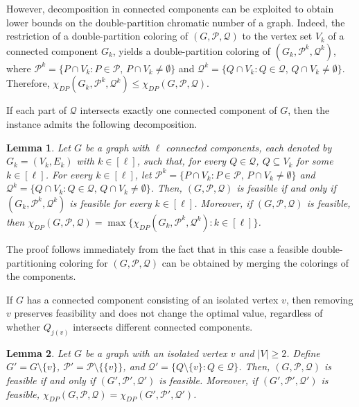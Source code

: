 \documentclass[preprint, 11pt, authoryear]{elsarticle}
\newtheorem{lemma}{Lemma}[section]
\newcommand{\PP}{{\mathcal P}}
\newcommand{\QQ}{{\mathcal Q}}
\newcommand{\dpcn}[1]{\chi_{DP}(#1)}
\begin{document}
However, decomposition in connected components can be exploited to obtain lower bounds on the double-partition chromatic number of a graph. Indeed, the restriction of a double-partition coloring of $(G,\PP,\QQ)$ to the vertex set $V_k$ of a connected component $G_k$, yields a double-partition coloring of  $(G_k,\PP^k,\QQ^k)$, 
where  $\PP^k=\{P\cap V_k : P\in \PP, \,  P\cap V_k \neq \emptyset\}$ and $\QQ^k=\{Q\cap V_k : Q\in \QQ,\,  Q\cap V_k \neq \emptyset\}$.
Therefore,
$\dpcn{G_k,\PP^k,\QQ^k} \leq \dpcn{G,\PP,\QQ}$.


If each part of $\QQ$ intersects exactly one connected component of $G$, then the instance admits the following decomposition.

\begin{lemma}
\label{connectedcomponentsandisolatedvertices}
Let $G$ be a graph with $\ell$ connected components, each denoted by $G_k=(V_k, E_k)$ with $k\in [\ell]$, such that, for every $Q \in \QQ$, $Q \subseteq V_k$ for some $k \in [\ell]$.
For every $k \in [\ell]$, let $\PP^k = \{P \cap V_k: P \in \PP, \,P\cap V_k \neq \emptyset\}$ and $\QQ^k = \{Q \cap V_k: Q \in \QQ, \, Q\cap V_k \neq \emptyset\}$.
Then, $(G,\mathcal{P},\mathcal{Q})$ is feasible if and only if $(G_k, \mathcal{P}^k, \mathcal{Q}^k)$ is feasible for every $k\in [\ell]$. Moreover, if $(G,\mathcal{P},\mathcal{Q})$ is feasible, then
$\dpcn{G, \mathcal{P}, \mathcal{Q}}=\max \{\dpcn{G_k, \mathcal{P}^k, \mathcal{Q}^k}:k\in [\ell]\}$.
\end{lemma}

The proof follows immediately from the fact that in this case a feasible double-partitioning coloring for $(G, \PP, \QQ)$ can be obtained by merging the colorings of the components.

If $G$ has a connected component consisting of an isolated vertex $v$, then removing $v$ preserves feasibility and does not change the optimal value, regardless of whether $Q_{j(v)}$ intersects different connected components.

\begin{lemma}\label{Isolated}
Let $G$ be a graph with an isolated vertex $v$ and $|V| \geq 2$.
Define $G' = G \setminus \{v\}$, $\PP' = \PP \setminus \{\{v\}\}$, and $\QQ' = \{ Q \setminus \{v\} : Q \in \QQ\}$.
Then, $(G,\mathcal{P},\mathcal{Q})$ is feasible if and only if $(G', \mathcal{P}', \mathcal{Q}')$ is feasible.
Moreover, if $(G', \mathcal{P}', \mathcal{Q}')$ is feasible,
$\dpcn{G, \mathcal{P}, \mathcal{Q}} = \dpcn{G', \mathcal{P}', \mathcal{Q}'}$.
\end{lemma}
\end{document}
